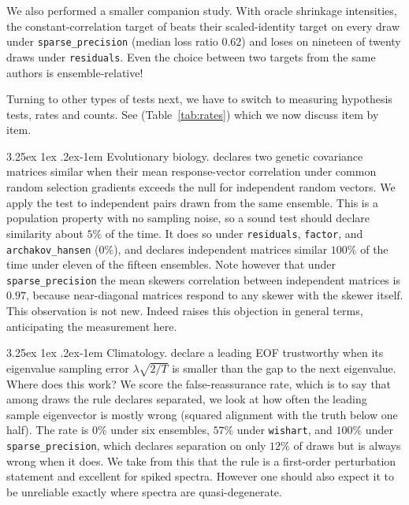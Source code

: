 \documentclass[11pt]{article}
\makeatletter
\renewcommand\paragraph{\@startsection{paragraph}{4}{\z@}%
  {3.25ex \@plus1ex \@minus.2ex}{-1em}%
  {\normalfont\normalsize\itshape}}
\makeatother
\begin{document}
We also performed a smaller companion study. With oracle shrinkage intensities, the
constant-correlation target of \citet{ledoit2003} beats their
scaled-identity target \citep{ledoit2004} on every draw under \texttt{sparse\_precision}
(median loss ratio $0.62$) and loses on nineteen of twenty draws under
\texttt{residuals}. Even the choice between two targets from the same
authors is ensemble-relative!

Turning to other types of tests next, we have to switch to measuring hypothesis tests, rates and counts. See (Table~\ref{tab:rates}) which we now discuss item by item.

\paragraph{Evolutionary biology.} \citet{cheverud1996} declares two genetic
covariance matrices similar when their mean response-vector correlation
under common random selection gradients exceeds the null for independent
random vectors. We apply the test to independent pairs drawn from the
same ensemble. This is a population property with no sampling noise, so a
sound test should declare similarity about $5\%$ of the time. It does so
under \texttt{residuals}, \texttt{factor}, and \texttt{archakov\_hansen}
($0\%$), and declares independent matrices similar $100\%$ of the time
under eleven of the fifteen ensembles. Note however that under \texttt{sparse\_precision}
the mean skewers correlation between independent matrices is $0.97$,
because near-diagonal matrices respond to any skewer with the skewer
itself. This observation is not new. Indeed \citet{rohlf2017} raises this objection in general terms, anticipating the measurement here.

\paragraph{Climatology.} \citet{north1982} declare a leading EOF
trustworthy when its eigenvalue sampling error $\lambda\sqrt{2/T}$ is
smaller than the gap to the next eigenvalue. Where does this work? We score the
false-reassurance rate, which is to say that among draws the rule declares separated, we look at how
often the leading sample eigenvector is mostly wrong (squared
alignment with the truth below one half). The rate is $0\%$ under six
ensembles, $57\%$ under \texttt{wishart}, and $100\%$ under
\texttt{sparse\_precision}, which declares separation on only $12\%$ of
draws but is always wrong when it does. We take from this that the rule is a first-order
perturbation statement and excellent for spiked spectra. However one should also
expect it to be unreliable exactly
where spectra are quasi-degenerate.
\end{document}
